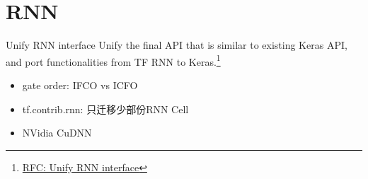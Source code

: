 
\section{RNN}

\begin{frame}{Unify RNN interface}
    Unify the final API that is similar to existing Keras API, and port functionalities from TF RNN to Keras.\footnote{\href{https://github.com/tensorflow/community/pull/15/}{RFC: Unify RNN interface}}

    \begin{itemize}
        \item gate order: IFCO vs ICFO
        \item tf.contrib.rnn: 只迁移少部份RNN Cell
        \item NVidia CuDNN
    \end{itemize}

\end{frame}
